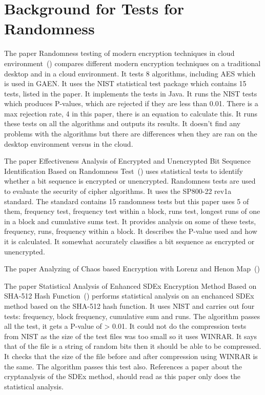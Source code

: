 \section{Background for Tests for Randomness}
\label{sec:BackgroundTests}

The paper Randomness testing of modern encryption techniques in cloud environment~(\cite{6236554}) compares different modern encryption techniques on a traditional desktop and in a cloud environment. It tests 8 algorithms, including AES which is used in GAEN. It uses the NIST statistical test package which contains 15 tests, listed in the paper. It implements the tests in Java. It runs the NIST tests which produces P-values, which are rejected if they are less than 0.01. There is a max rejection rate, 4 in this paper, there is an equation to calculate this. It runs these tests on all the algorithms and outputs its results. It doesn't find any problems with the algorithms but there are differences when they are ran on the desktop environment versus in the cloud. \par

The paper Effectiveness Analysis of Encrypted and Unencrypted Bit Sequence Identification Based on Randomness Test~(\cite{7406118}) uses statistical tests to identify whether a bit sequence is encrypted or unencrypted. Randomness tests are used to evaluate the security of cipher algorithms. It uses the SP800-22 rev1a standard. The standard contains 15 randomness tests but this paper uses 5 of them, frequency test, frequency test within a block, runs test, longest runs of one in a block and cumulative sums test. It provides analysis on some of these tests, frequency, runs, frequency within a block. It describes the P-value used and how it is calculated. It somewhat accurately classifies a bit sequence as encrypted or unencrypted.\par

The paper Analyzing of Chaos based Encryption with Lorenz and Henon Map~(\cite{8653652})

The paper Statistical Analysis of Enhanced SDEx Encryption Method Based on SHA-512 Hash Function~(\cite{9209663}) performs statistical analysis on an enchanced SDEx method based on the SHA-512 hash function. It uses NIST and carries out four tests: frequency, block frequency, cumulative sum and runs. The algorithm passes all the test, it gets a P-value of > 0.01. It could not do the compression tests from NIST as the size of the test files was too small so it uses WINRAR. It says that of the file is a string of random bits then it should be able to be compressed. It checks that the size of the file before and after compression using WINRAR is the same. The algorithm passes this test also. References a paper about the cryptanalysis of the SDEx method, should read as this paper only does the statistical analysis.\par

